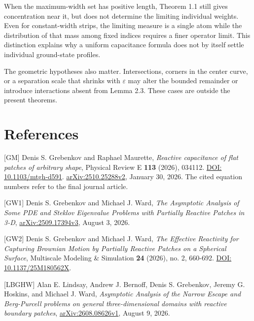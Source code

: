 \documentclass[11pt]{article}
\begin{document}
When the maximum-width set has positive length, Theorem 1.1 still gives
concentration near it, but does not determine the limiting individual
weights. Even for constant-width strips, the limiting measure is a
single atom while the distribution of that mass among fixed indices
requires a finer operator limit. This distinction explains why a uniform
capacitance formula does not by itself settle individual ground-state
profiles.

The geometric hypotheses also matter. Intersections, corners in the
center curve, or a separation scale that shrinks with \(\varepsilon\)
may alter the bounded remainder or introduce interactions absent from
Lemma 2.3. These cases are outside the present theorems.

\sloppy\section{References}\label{references}

{[}GM{]} Denis S. Grebenkov and Raphael Maurette, \emph{Reactive
capacitance of flat patches of arbitrary shape}, Physical Review E
\textbf{113} (2026), 034112.
\href{https://doi.org/10.1103/mtgh-d591}{DOI: 10.1103/mtgh-d591}.
\href{https://arxiv.org/abs/2510.25288v2}{arXiv:2510.25288v2}, January
30, 2026. The cited equation numbers refer to the final journal article.

{[}GW1{]} Denis S. Grebenkov and Michael J. Ward, \emph{The Asymptotic
Analysis of Some PDE and Steklov Eigenvalue Problems with Partially
Reactive Patches in 3-D},
\href{https://arxiv.org/abs/2509.17394v3}{arXiv:2509.17394v3}, August 3,
2026.

{[}GW2{]} Denis S. Grebenkov and Michael J. Ward, \emph{The Effective
Reactivity for Capturing Brownian Motion by Partially Reactive Patches
on a Spherical Surface}, Multiscale Modeling \& Simulation \textbf{24}
(2026), no. 2, 660-692. \href{https://doi.org/10.1137/25M180562X}{DOI:
10.1137/25M180562X}.

{[}LBGHW{]} Alan E. Lindsay, Andrew J. Bernoff, Denis S. Grebenkov,
Jeremy G. Hoskins, and Michael J. Ward, \emph{Asymptotic Analysis of the
Narrow Escape and Berg-Purcell problems on general three-dimensional
domains with reactive boundary patches},
\href{https://arxiv.org/abs/2608.08626v1}{arXiv:2608.08626v1}, August 9,
2026.
\end{document}
